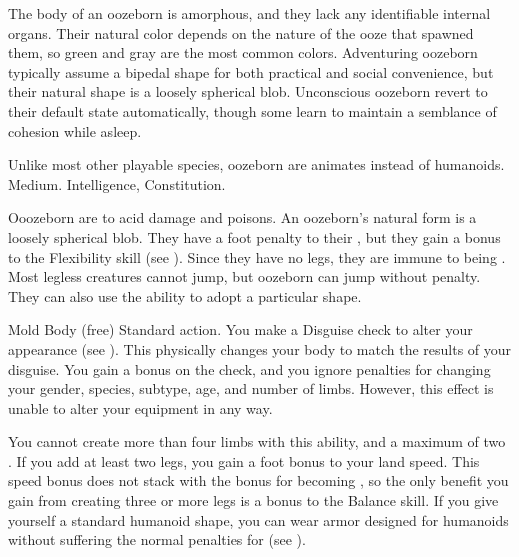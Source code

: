   The body of an oozeborn is amorphous, and they lack any identifiable internal organs.
  Their natural color depends on the nature of the ooze that spawned them, so green and gray are the most common colors.
  Adventuring oozeborn typically assume a bipedal shape for both practical and social convenience, but their natural shape is a loosely spherical blob.
  Unconscious oozeborn revert to their default state automatically, though some learn to maintain a semblance of cohesion while asleep.

   Unlike most other playable species, oozeborn are animates instead of humanoids.
   Medium.
    Intelligence,  Constitution.
  \begin{itemize}
     Ooozeborn are  to acid damage and poisons.
     An oozeborn's natural form is a loosely spherical blob.
      They have a  foot penalty to their , but they gain a  bonus to the Flexibility skill (see ).
      Since they have no legs, they are immune to being \prone.
      Most legless creatures cannot jump, but oozeborn can jump without penalty.
      They can also use the  ability to adopt a particular shape.
      \begin{sustainability}{Mold Body}{ (free)}
        \abilityusagetime Standard action.
        \rankline
        You make a Disguise check to alter your appearance (see ).
        This physically changes your body to match the results of your disguise.
        You gain a  bonus on the check, and you ignore penalties for changing your gender, species, subtype, age, and number of limbs.
        However, this effect is unable to alter your equipment in any way.

        You cannot create more than four limbs with this ability, and a maximum of two .
        If you add at least two legs, you gain a  foot bonus to your land speed.
        This speed bonus does not stack with the bonus for becoming , so the only benefit you gain from creating three or more legs is a  bonus to the Balance skill.
        If you give yourself a standard humanoid shape, you can wear armor designed for humanoids without suffering the normal penalties for  (see ).


\end{sustainability}
\end{itemize}
